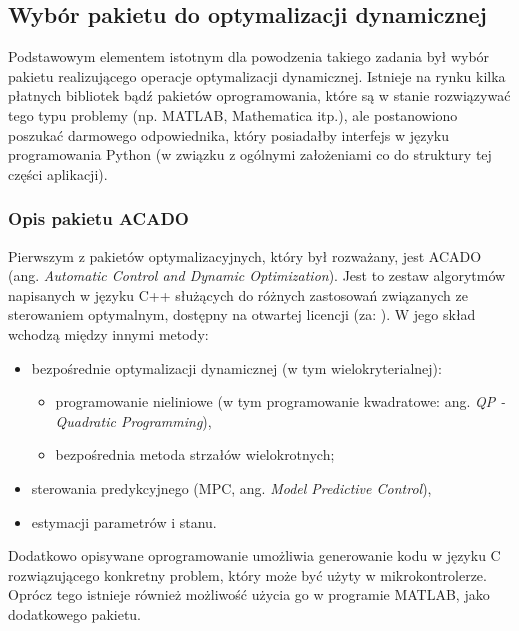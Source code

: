 \subsection{Wybór pakietu do optymalizacji dynamicznej}
\label{sub:czesc-wyzsza-wybor}

Podstawowym elementem istotnym dla powodzenia takiego zadania był wybór pakietu realizującego operacje optymalizacji dynamicznej. Istnieje na rynku kilka płatnych bibliotek bądź pakietów oprogramowania, które są w stanie rozwiązywać tego typu problemy (np. MATLAB, Mathematica itp.), ale postanowiono poszukać darmowego odpowiednika, który posiadałby interfejs w języku programowania Python (w związku z ogólnymi założeniami co do struktury tej części aplikacji).


\subsubsection{Opis pakietu ACADO}

Pierwszym z pakietów optymalizacyjnych, który był rozważany, jest ACADO (ang. \emph{Automatic Control and Dynamic
Optimization}). Jest to zestaw algorytmów napisanych w języku C++ służących do różnych zastosowań związanych ze sterowaniem optymalnym, dostępny na otwartej licencji (za: \cite{Houska2011}). W jego skład wchodzą między innymi metody:
\begin{itemize}
    \item bezpośrednie optymalizacji dynamicznej (w tym wielokryterialnej):
        \begin{itemize}
            \item programowanie nieliniowe (w tym programowanie kwadratowe: ang. \emph{QP - Quadratic Programming}),
            \item bezpośrednia metoda strzałów wielokrotnych;
        \end{itemize}
    \item sterowania predykcyjnego (MPC, ang. \emph{Model Predictive Control}),
    \item estymacji parametrów i stanu.
\end{itemize}

Dodatkowo opisywane oprogramowanie umożliwia generowanie kodu w języku C rozwiązującego konkretny problem, który może być użyty w mikrokontrolerze. Oprócz tego istnieje również możliwość użycia go w programie MATLAB, jako dodatkowego pakietu.


